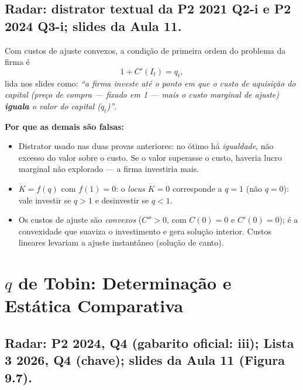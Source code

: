 \documentclass[12pt, a4paper]{article}
\begin{document}
\subsection{Radar: distrator textual da P2 2021 Q2-i e P2 2024 Q3-i; slides da Aula 11.}

\begin{correctbox}[title={Resposta correta: a)}]
Com custos de ajuste convexos, a condição de primeira ordem do problema da
firma é
\[
1 + C'(I_t) = q_t,
\]
lida nos slides como: \emph{``a firma investe até o ponto em que o custo de
aquisição do capital (preço de compra --- fixado em 1 --- mais o custo marginal
de ajuste) \textbf{iguala} o valor do capital ($q_t$)''}. \checkmark

\textbf{Por que as demais são falsas:}
\begin{itemize}[leftmargin=*]
\item[b)] Distrator usado nas duas provas anteriores: no ótimo há
\emph{igualdade}, não excesso do valor sobre o custo. Se o valor superasse o
custo, haveria lucro marginal não explorado --- a firma investiria mais.
\item[c)] $\dot{K} = f(q)$ com $f(1) = 0$: o \emph{locus} $\dot{K}=0$
corresponde a $q = 1$ (não $q=0$): vale investir se $q>1$ e desinvestir se
$q<1$.
\item[d)] Os custos de ajuste são \emph{convexos} ($C''>0$, com $C(0)=0$ e
$C'(0)=0$); é a convexidade que suaviza o investimento e gera solução interior.
Custos lineares levariam a ajuste instantâneo (solução de canto).
\end{itemize}
\end{correctbox}

\section{$q$ de Tobin: Determinação e Estática Comparativa}

\subsection{Radar: P2 2024, Q4 (gabarito oficial: iii); Lista 3 2026, Q4 (chave); slides da Aula 11 (Figura 9.7).}
\end{document}
